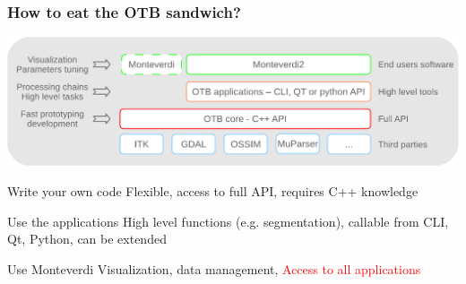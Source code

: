 \documentclass[8pt]{beamer}
\begin{document}
\begin{frame}
\frametitle{How to eat the OTB sandwich?}
\vspace{-0.5cm}
\begin{center}
\includegraphics[width=\textwidth]{images/sandwich.pdf}
\end{center}
\vspace{-0.5cm}
\begin{block}{Write your own code}
 Flexible, access to full API, requires C++ knowledge
\end{block}
\begin{block}{Use the applications}
 High level functions (e.g. segmentation), callable from CLI, Qt, Python, can be extended
\end{block}
\begin{block}{Use Monteverdi}
Visualization, data management, \textcolor{red}{Access to all applications}
\end{block}
\end{frame}
\end{document}
